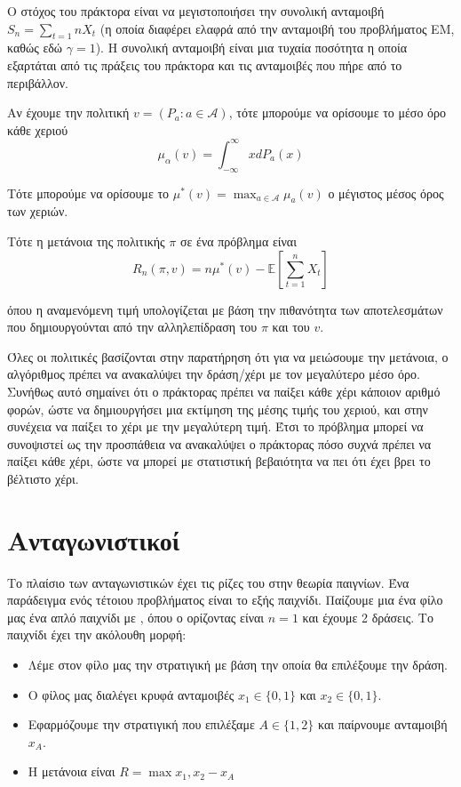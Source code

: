 Ο στόχος του πράκτορα είναι να μεγιστοποιήσει την συνολική ανταμοιβή $S_n = \sum_{t=1}{n}X_t$ (η οποία διαφέρει ελαφρά από την ανταμοιβή του προβλήματος ΕΜ, καθώς εδώ $γ=1$). Η συνολική ανταμοιβή είναι μια τυχαία ποσότητα η οποία εξαρτάται από τις πράξεις του πράκτορα και τις ανταμοιβές που πήρε από το περιβάλλον.

Αν έχουμε την πολιτική $v = (P_a : a \in \mathcal{A})$, τότε μπορούμε να ορίσουμε το μέσο όρο κάθε χεριού
\begin{equation*}
    μ_α(v) = \int_{-\infty}^{\infty}xdP_a(x)
\end{equation*}

Τότε μπορούμε να ορίσουμε το $μ^*(v) = \max_{a\in \mathcal{A}}μ_a(v)$ ο μέγιστος μέσος όρος των χεριών.

Τότε η μετάνοια της πολιτικής $π$ σε ένα πρόβλημα  είναι 
\begin{equation}
    R_n(π,v) = nμ^*(v) - \mathbb{E}\left[ \sum_{t=1}^{n} X_t \right]
\end{equation}

όπου η αναμενόμενη τιμή υπολογίζεται με βάση την πιθανότητα των αποτελεσμάτων που δημιουργούνται από την αλληλεπίδραση του $π$ και του $v$.

Όλες οι πολιτικές βασίζονται στην παρατήρηση ότι για να μειώσουμε την μετάνοια, ο αλγόριθμος πρέπει να ανακαλύψει την δράση/χέρι με τον μεγαλύτερο μέσο όρο. Συνήθως αυτό σημαίνει ότι ο πράκτορας πρέπει να παίξει κάθε χέρι κάποιον αριθμό φορών, ώστε να δημιουργήσει μια εκτίμηση της μέσης τιμής του χεριού, και στην συνέχεια να παίξει το χέρι με την μεγαλύτερη τιμή. Έτσι το πρόβλημα μπορεί να συνοψιστεί ως την προσπάθεια να ανακαλύψει ο πράκτορας πόσο συχνά πρέπει να παίξει κάθε χέρι, ώστε να μπορεί με στατιστική βεβαιότητα να πει ότι έχει βρει το βέλτιστο χέρι.

\section{Ανταγωνιστικοί }

Το πλαίσιο των ανταγωνιστικών  έχει τις ρίζες του στην θεωρία παιγνίων. Ένα παράδειγμα ενός τέτοιου προβλήματος είναι το εξής παιχνίδι. Παίζουμε μια ένα φίλο μας ένα απλό παιχνίδι με , όπου ο ορίζοντας είναι $n=1$ και έχουμε 2 δράσεις. Το παιχνίδι έχει την ακόλουθη μορφή:
\begin{itemize}
    \item Λέμε στον φίλο μας την στρατιγική με βάση την οποία θα επιλέξουμε την δράση.
    \item Ο φίλος μας διαλέγει κρυφά ανταμοιβές $x_1 \in \{0,1\}$ και $x_2 \in \{0,1\}$.
    \item Εφαρμόζουμε την στρατιγική που επιλέξαμε $A \in \{1,2\}$ και παίρνουμε ανταμοιβή $x_A$.
    \item Η μετάνοια είναι $R = \max{x_1,x_2} - x_A$
\end{itemize}

